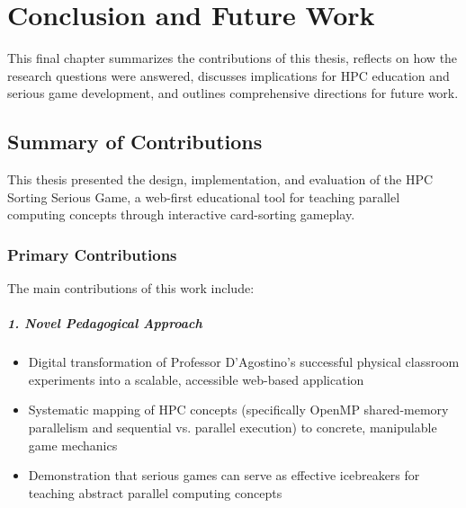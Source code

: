 \chapter{Conclusion and Future Work}
\label{ch:conclusion}

This final chapter summarizes the contributions of this thesis, reflects on how the research questions were answered, discusses implications for HPC education and serious game development, and outlines comprehensive directions for future work.

\section{Summary of Contributions}
\label{sec:summary-contributions}

This thesis presented the design, implementation, and evaluation of the HPC Sorting Serious Game, a web-first educational tool for teaching parallel computing concepts through interactive card-sorting gameplay.

\subsection{Primary Contributions}
\label{subsec:primary-contributions}

The main contributions of this work include:

\paragraph*{1. Novel Pedagogical Approach}

\begin{itemize}
    \item Digital transformation of Professor D'Agostino's successful physical classroom experiments into a scalable, accessible web-based application
    \item Systematic mapping of HPC concepts (specifically OpenMP shared-memory parallelism and sequential vs. parallel execution) to concrete, manipulable game mechanics
    \item Demonstration that serious games can serve as effective icebreakers for teaching abstract parallel computing concepts
\end{itemize}

